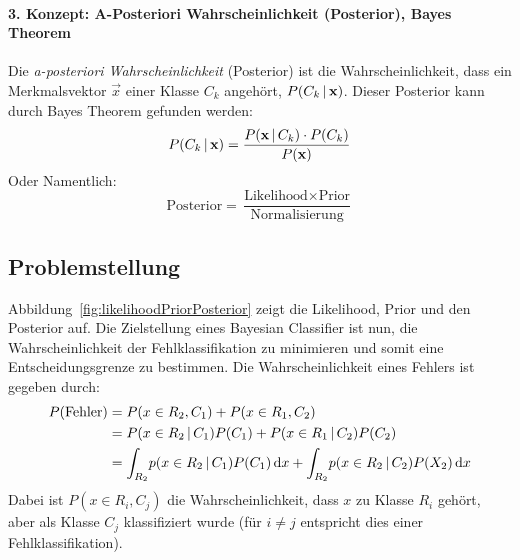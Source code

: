 			\paragraph{3. Konzept: A-Posteriori Wahrscheinlichkeit (Posterior), Bayes Theorem}
				Die \emph{a-posteriori Wahrscheinlichkeit} (Posterior) ist die Wahrscheinlichkeit, dass ein Merkmalsvektor \(\vec{x}\) einer Klasse \( C_k \) angehört, \dh \( P(C_k \,\vert\, \boldsymbol{\mathrm{x}}) \). Dieser Posterior kann durch Bayes Theorem gefunden werden:
				\begin{equation*}
					P(C_k \,\vert\, \boldsymbol{\mathrm{x}}) = \frac{P(\boldsymbol{\mathrm{x}} \,\vert\, C_k) \cdot P(C_k)}{P(\boldsymbol{\mathrm{x}})}
				\end{equation*}
				Oder Namentlich:
				\begin{equation*}
					\text{Posterior} = \frac{\text{Likelihood} \times \text{Prior}}{\text{Normalisierung}}
				\end{equation*}

		\subsection{Problemstellung}
			Abbildung~\ref{fig:likelihoodPriorPosterior} zeigt die Likelihood, Prior und den Posterior auf. Die Zielstellung eines Bayesian Classifier ist nun, die Wahrscheinlichkeit der Fehlklassifikation zu minimieren und somit eine Entscheidungsgrenze zu bestimmen. Die Wahrscheinlichkeit eines Fehlers ist gegeben durch:
			\begin{align*}
				P(\text{Fehler}) &= P(x \in R_2, C_1) + P(x \in R_1, C_2) \\
					&= P(x \in R_2 \,\vert\, C_1) P(C_1) + P(x \in R_1 \,\vert\, C_2) P(C_2) \\
					&= \int_{R_2} \! p(x \in R_2 \,\vert\, C_1) P(C_1) \dd{x} + \int_{R_2} \! p(x \in R_2 \,\vert\, C_2) P(X_2) \dd{x}
			\end{align*}
			Dabei ist \( P(x \in R_i, C_j) \) die Wahrscheinlichkeit, dass \(x\) zu Klasse \(R_i\) gehört, aber als Klasse \(C_j\) klassifiziert wurde (für \( i \neq j \) entspricht dies einer Fehlklassifikation).

